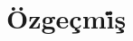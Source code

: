 \chapter*{Özgeçm\.{i}ş}
\thispagestyle{empty}


\begin{center}

\hspace{0cm}{\textbf{\tezyazari}}\\
\end{center}
\setlength{\tabcolsep}{20pt}
\renewcommand{\arraystretch}{0.5}

